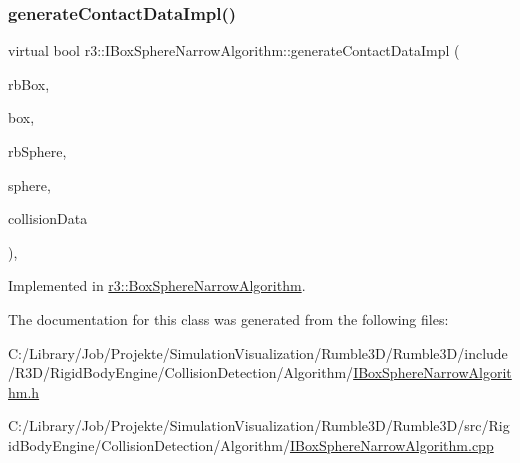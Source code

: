 \subsubsection{\texorpdfstring{generate\+Contact\+Data\+Impl()}{generateContactDataImpl()}}
{\footnotesize\ttfamily virtual bool r3\+::\+I\+Box\+Sphere\+Narrow\+Algorithm\+::generate\+Contact\+Data\+Impl (\begin{DoxyParamCaption}\item[{\mbox{\hyperlink{classr3_1_1_rigid_body}{Rigid\+Body}} $\ast$}]{rb\+Box,  }\item[{\mbox{\hyperlink{classr3_1_1_collision_box}{Collision\+Box}} $\ast$}]{box,  }\item[{\mbox{\hyperlink{classr3_1_1_rigid_body}{Rigid\+Body}} $\ast$}]{rb\+Sphere,  }\item[{\mbox{\hyperlink{classr3_1_1_collision_sphere}{Collision\+Sphere}} $\ast$}]{sphere,  }\item[{\mbox{\hyperlink{classr3_1_1_collision_data}{Collision\+Data}} \&}]{collision\+Data }\end{DoxyParamCaption})\hspace{0.3cm}{\ttfamily [protected]}, {}}



Implemented in \mbox{\hyperlink{classr3_1_1_box_sphere_narrow_algorithm_a2fc345fdec27e85f0e569afa0d500865}{r3\+::\+Box\+Sphere\+Narrow\+Algorithm}}.



The documentation for this class was generated from the following files\+:\begin{DoxyCompactItemize}
\item 
C\+:/\+Library/\+Job/\+Projekte/\+Simulation\+Visualization/\+Rumble3\+D/\+Rumble3\+D/include/\+R3\+D/\+Rigid\+Body\+Engine/\+Collision\+Detection/\+Algorithm/\mbox{\hyperlink{_i_box_sphere_narrow_algorithm_8h}{I\+Box\+Sphere\+Narrow\+Algorithm.\+h}}\item 
C\+:/\+Library/\+Job/\+Projekte/\+Simulation\+Visualization/\+Rumble3\+D/\+Rumble3\+D/src/\+Rigid\+Body\+Engine/\+Collision\+Detection/\+Algorithm/\mbox{\hyperlink{_i_box_sphere_narrow_algorithm_8cpp}{I\+Box\+Sphere\+Narrow\+Algorithm.\+cpp}}\end{DoxyCompactItemize}

